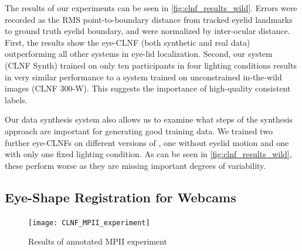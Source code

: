 The results of our experiments can be seen in \autoref{fig:clnf_results_wild}. 
Errors were recorded as the RMS point-to-boundary distance from tracked eyelid landmarks to ground truth eyelid boundary, and were normalized by inter-ocular distance. 
First, the results show the eye-CLNF (both synthetic and real data) outperforming all other systems in eye-lid localization. 
Second, our system (CLNF Synth) trained on only ten participants in four lighting conditions results in very similar performance to a system trained on unconstrained in-the-wild images (CLNF 300-W). This suggests the importance of high-quality consistent labels.

Our data synthesis system also allows us to examine what steps of the synthesis approach are important for generating good training data. We trained two further eye-CLNFs on different versions of \dataset, one without eyelid motion and one with only one fixed lighting condition. As can be seen in \autoref{fig:clnf_results_wild}, these perform worse as they are missing important degrees of variability.

\subsection{Eye-Shape Registration for Webcams}


\begin{figure}
    \centering
    \texttt{[image: CLNF\_MPII\_experiment]}
    \caption{Results of annotated MPII experiment}
    \label{fig:clnf_results_MPII}
\end{figure}



